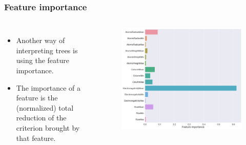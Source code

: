 \documentclass[aspectratio=169]{beamer}
\begin{document}
\begin{frame}
\frametitle{Feature importance}
\begin{columns}
\begin{itemize}
\item Another way of interpreting trees is using the feature importance.
\item The importance of a feature is the (normalized) total reduction of the criterion brought by that feature.
\end{itemize}
\begin{figure}
    \centering
    \includegraphics[width=\textwidth]{figures/feature-importance.png}
\end{figure}
\end{columns}
\end{frame}
\end{document}
